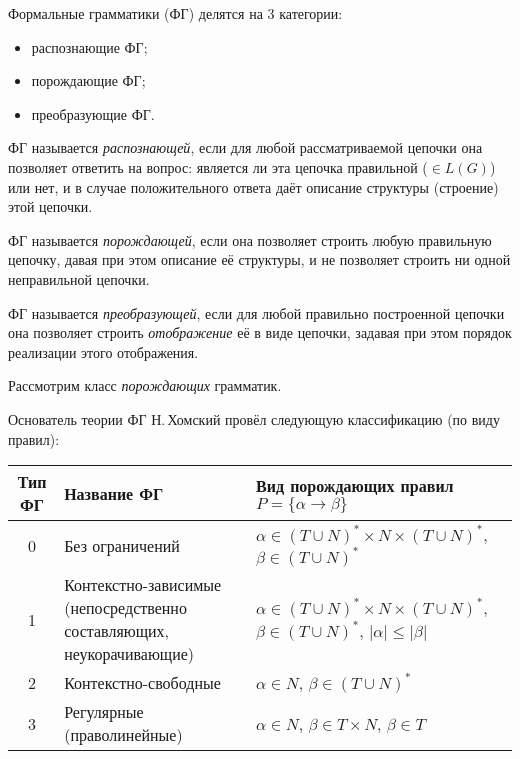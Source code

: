 Формальные грамматики (ФГ) делятся на 3 категории:
\begin{itemize}
\item распознающие ФГ;
\item порождающие ФГ;
\item преобразующие ФГ.
\end{itemize}

\begin{defin}
  ФГ называется \emph{распознающей}, если для любой рассматриваемой
  цепочки она позволяет ответить на вопрос: является ли эта цепочка
  правильной ($\in L(G)$) или нет, и в случае положительного ответа
  даёт описание структуры (строение) этой цепочки.

  ФГ называется \emph{порождающей}, если она позволяет строить любую
  правильную цепочку, давая при этом описание её структуры, и не
  позволяет строить ни одной неправильной цепочки.

  ФГ называется \emph{преобразующей}, если для любой правильно
  построенной цепочки она позволяет строить \emph{отображение} её в
  виде цепочки, задавая при этом порядок реализации этого отображения.
\end{defin}

Рассмотрим класс \emph{порождающих} грамматик.

Основатель теории ФГ Н.\,Хомский провёл следующую классификацию (по
виду правил):


\begin{table}[!hp]
  \centering
  \begin{tabular}[!hp]{|c|p{}|p{}|}
    \hline
    Тип ФГ & Название ФГ & Вид порождающих правил ${P = \{\alpha \to
    \beta\}}$ \\
    \hline
    0 & Без ограничений & $\alpha \in (T \cup N)^* \times N \times (T
    \cup N)^*$, ${\beta \in (T \cup N)^*}$\\
    \hline
    1 & Контекстно-зависимые (непосредственно составляющих,
    неукорачивающие) & $\alpha \in (T \cup N)^* \times N \times (T
    \cup N)^*$, ${\beta \in (T \cup N)^*}$, $|\alpha| \leqslant
    |\beta|$\\
    \hline
    2 & Контекстно-свободные & $\alpha \in N$, $\beta \in (T \cup
    N)^*$ \\
    \hline
    3 & Регулярные (праволинейные) & $\alpha \in N$, $\beta \in T
    \times N$, $\beta \in T$\\
    \hline
  \end{tabular}
  \label{tab:chomsky}
\end{table}

